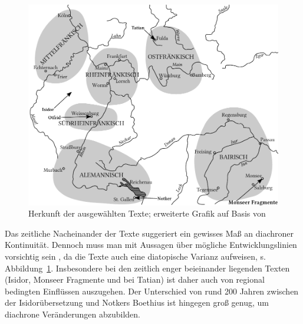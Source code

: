 \begin{figure}[p]
\includegraphics[width=\textwidth]{images/koenig-atlas.pdf}
\caption {Herkunft der ausgewählten Texte; erweiterte Grafik auf Basis von  \textcite[66]{Konig2015}\label{abb:schreiborte}}
\end{figure}

Das zeitliche Nacheinander der Texte suggeriert ein gewisses Maß an diachroner Kontinuität. Dennoch muss man mit Aussagen über mögliche Entwicklungslinien  vorsichtig sein \parencite[vgl. hierzu auch][158]{Leiss2000}, da die Texte auch eine diatopische Varianz aufweisen, s. Abbildung~\ref{abb:schreiborte}. Insbesondere bei den zeitlich enger beieinander liegenden Texten (Isidor, Monseer Fragmente und bei Tatian) ist daher auch von regional bedingten Einflüssen auszugehen. Der Unterschied von rund 200 Jahren zwischen der Isidorübersetzung und Notkers Boethius ist hingegen groß genug, um diachrone Veränderungen abzubilden.


